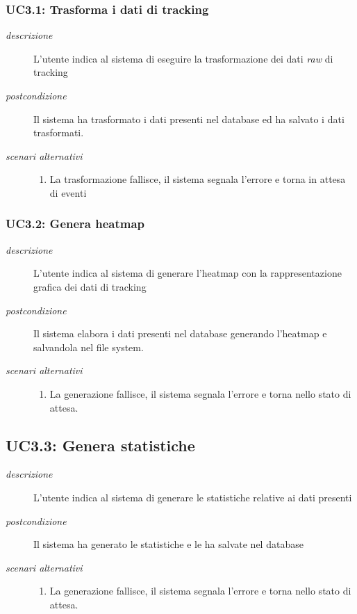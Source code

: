 \subsubsection{UC3.1: Trasforma i dati di tracking} \label{sec:uc3.1}
\begin{description}
 \item[\em{descrizione}] L'utente indica al sistema di eseguire la trasformazione dei dati \textit{raw} di tracking
  \item[\em{postcondizione}] Il sistema ha trasformato i dati presenti nel database ed ha salvato i dati trasformati.
  
  \item[\em{scenari alternativi}]  \mbox{}
    \begin{enumerate} 
  \item La trasformazione fallisce, il sistema segnala l'errore e torna in attesa di eventi
  \end{enumerate}  
  
  \end{description}
  
\subsubsection{UC3.2: Genera heatmap} \label{sec:uc3.2}
\begin{description}
 \item[\em{descrizione}] L'utente indica al sistema di generare l'heatmap con la rappresentazione grafica dei dati di tracking
  \item[\em{postcondizione}] Il sistema elabora i dati presenti nel database generando l'heatmap e salvandola nel file system.
  
\item[\em{scenari alternativi}] \mbox{}
  \begin{enumerate}
  \item La generazione fallisce, il sistema segnala l'errore e torna nello stato di attesa.
  \end{enumerate}  
  \end{description}

\subsection{UC3.3: Genera statistiche} \label{sec:UC3.3}
\begin{description}
\item[\em{descrizione }]L'utente indica al sistema di generare le statistiche relative ai dati presenti
\item[\em{postcondizione }] Il sistema ha generato le statistiche e le ha salvate nel database
\item[\em{scenari alternativi }] \mbox{} 
\begin{enumerate} 
\item La generazione fallisce, il sistema segnala l'errore e torna nello stato di attesa.
\end{enumerate}
\end{description}



